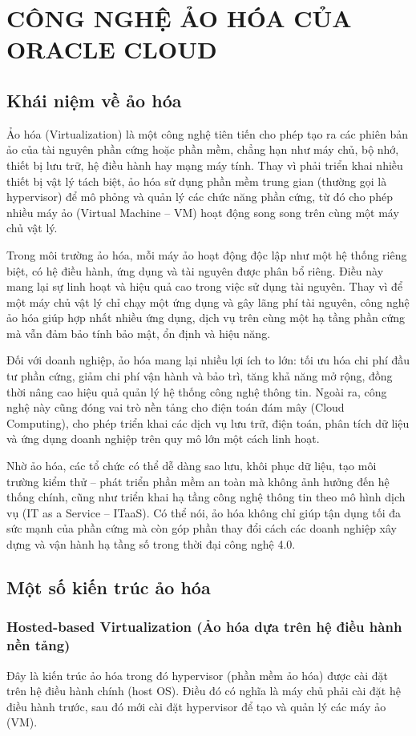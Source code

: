 \section{CÔNG NGHỆ ẢO HÓA CỦA ORACLE CLOUD}
\subsection{Khái niệm về ảo hóa}
Ảo hóa (Virtualization) là một công nghệ tiên tiến cho phép tạo ra các phiên bản ảo của tài nguyên phần cứng hoặc phần mềm, chẳng hạn như máy chủ, bộ nhớ, thiết bị lưu trữ, hệ điều hành hay mạng máy tính. Thay vì phải triển khai nhiều thiết bị vật lý tách biệt, ảo hóa sử dụng phần mềm trung gian (thường gọi là hypervisor) để mô phỏng và quản lý các chức năng phần cứng, từ đó cho phép nhiều máy ảo (Virtual Machine – VM) hoạt động song song trên cùng một máy chủ vật lý.

Trong môi trường ảo hóa, mỗi máy ảo hoạt động độc lập như một hệ thống riêng biệt, có hệ điều hành, ứng dụng và tài nguyên được phân bổ riêng. Điều này mang lại sự linh hoạt và hiệu quả cao trong việc sử dụng tài nguyên. Thay vì để một máy chủ vật lý chỉ chạy một ứng dụng và gây lãng phí tài nguyên, công nghệ ảo hóa giúp hợp nhất nhiều ứng dụng, dịch vụ trên cùng một hạ tầng phần cứng mà vẫn đảm bảo tính bảo mật, ổn định và hiệu năng.

Đối với doanh nghiệp, ảo hóa mang lại nhiều lợi ích to lớn: tối ưu hóa chi phí đầu tư phần cứng, giảm chi phí vận hành và bảo trì, tăng khả năng mở rộng, đồng thời nâng cao hiệu quả quản lý hệ thống công nghệ thông tin. Ngoài ra, công nghệ này cũng đóng vai trò nền tảng cho điện toán đám mây (Cloud Computing), cho phép triển khai các dịch vụ lưu trữ, điện toán, phân tích dữ liệu và ứng dụng doanh nghiệp trên quy mô lớn một cách linh hoạt.

Nhờ ảo hóa, các tổ chức có thể dễ dàng sao lưu, khôi phục dữ liệu, tạo môi trường kiểm thử – phát triển phần mềm an toàn mà không ảnh hưởng đến hệ thống chính, cũng như triển khai hạ tầng công nghệ thông tin theo mô hình dịch vụ (IT as a Service – ITaaS). Có thể nói, ảo hóa không chỉ giúp tận dụng tối đa sức mạnh của phần cứng mà còn góp phần thay đổi cách các doanh nghiệp xây dựng và vận hành hạ tầng số trong thời đại công nghệ 4.0.

\subsection{Một số kiến trúc ảo hóa}
\subsubsection{Hosted-based Virtualization (Ảo hóa dựa trên hệ điều hành nền tảng)}
 Đây là kiến trúc ảo hóa trong đó hypervisor (phần mềm ảo hóa) được cài đặt trên hệ điều hành chính (host OS). Điều đó có nghĩa là máy chủ phải cài đặt hệ điều hành trước, sau đó mới cài đặt hypervisor để tạo và quản lý các máy ảo (VM).

